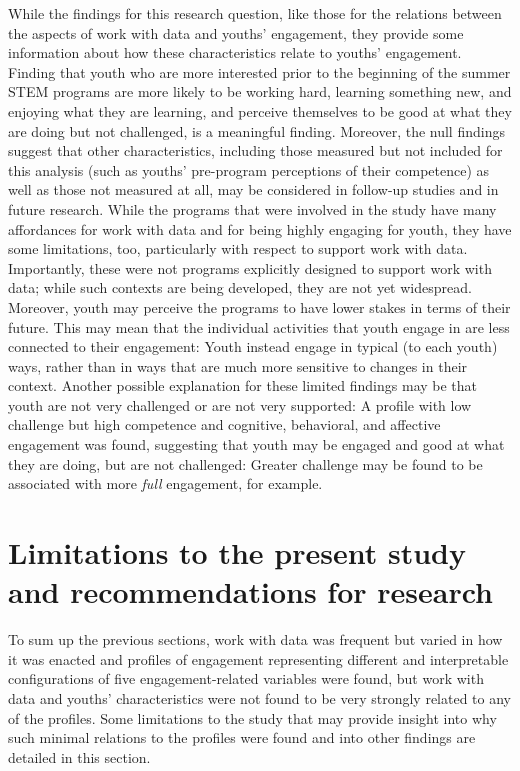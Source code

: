 \documentclass[]{book}
\theoremstyle{definition}
\theoremstyle{definition}
\theoremstyle{definition}
\theoremstyle{remark}
\begin{document}
While the findings for this research question, like those for the
relations between the aspects of work with data and youths' engagement,
they provide some information about how these characteristics relate to
youths' engagement. Finding that youth who are more interested prior to
the beginning of the summer STEM programs are more likely to be working
hard, learning something new, and enjoying what they are learning, and
perceive themselves to be good at what they are doing but not
challenged, is a meaningful finding. Moreover, the null findings suggest
that other characteristics, including those measured but not included
for this analysis (such as youths' pre-program perceptions of their
competence) as well as those not measured at all, may be considered in
follow-up studies and in future research. While the programs that were
involved in the study have many affordances for work with data and for
being highly engaging for youth, they have some limitations, too,
particularly with respect to support work with data. Importantly, these
were not programs explicitly designed to support work with data; while
such contexts are being developed, they are not yet widespread.
Moreover, youth may perceive the programs to have lower stakes in terms
of their future. This may mean that the individual activities that youth
engage in are less connected to their engagement: Youth instead engage
in typical (to each youth) ways, rather than in ways that are much more
sensitive to changes in their context. Another possible explanation for
these limited findings may be that youth are not very challenged or are
not very supported: A profile with low challenge but high competence and
cognitive, behavioral, and affective engagement was found, suggesting
that youth may be engaged and good at what they are doing, but are not
challenged: Greater challenge may be found to be associated with more
\emph{full} engagement, for example.

\section{Limitations to the present study and recommendations for
research}\label{limitations-to-the-present-study-and-recommendations-for-research}

To sum up the previous sections, work with data was frequent but varied
in how it was enacted and profiles of engagement representing different
and interpretable configurations of five engagement-related variables
were found, but work with data and youths' characteristics were not
found to be very strongly related to any of the profiles. Some
limitations to the study that may provide insight into why such minimal
relations to the profiles were found and into other findings are
detailed in this section.
\end{document}
